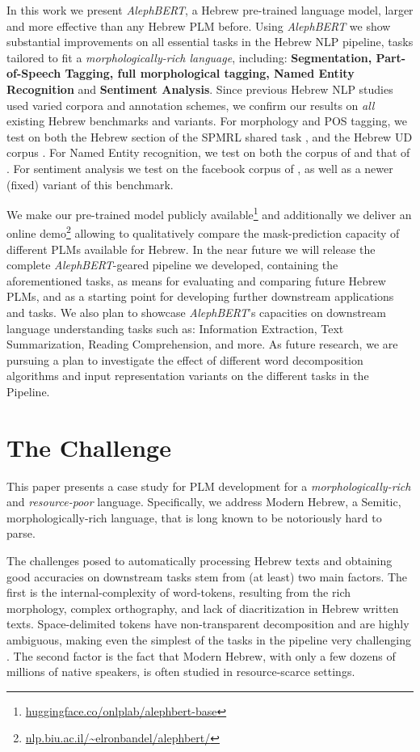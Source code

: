 \documentclass[11pt,a4paper]{article}
\begin{document}
In this work we present {\em AlephBERT}, a  Hebrew  pre-trained language model, larger and  more effective than any Hebrew PLM before. Using {\em AlephBERT} we show  substantial improvements on {all} essential tasks in the Hebrew NLP pipeline, tasks tailored to fit a {\em morphologically-rich language}, including:  {\bf Segmentation, Part-of-Speech Tagging, full morphological tagging, Named Entity Recognition} and {\bf  Sentiment Analysis}. Since previous Hebrew NLP studies used varied  corpora and annotation schemes, we confirm our results on {\em all} existing Hebrew benchmarks and variants. For morphology and POS tagging, we test on {both} the Hebrew section of the SPMRL shared task \cite{spmrl}, and the Hebrew  UD corpus \cite{hebUD}.  For Named Entity recognition, we test on  both the corpus of \citet{bmcner} and that of \citet{nemo}. For sentiment analysis we test on the facebook corpus of \citet{amram2018}, as well as a newer (fixed) variant of this benchmark.

We make 
our pre-trained 
model
publicly available\footnote{\url{huggingface.co/onlplab/alephbert-base}} and additionally we deliver an online demo\footnote{\url{nlp.biu.ac.il/~elronbandel/alephbert/}} allowing to qualitatively compare the mask-prediction capacity of different   PLMs  available for Hebrew. In the near future we will release the complete {\em AlephBERT}-geared pipeline we developed, containing the aforementioned tasks, as means for evaluating and comparing future Hebrew PLMs, and as a starting point for developing further downstream applications and tasks. 
We also plan to showcase {\em AlephBERT}'s capacities on downstream language understanding  tasks such as:  Information Extraction, Text Summarization, Reading Comprehension, and more.
As future research, we are pursuing a plan to investigate the effect of different word decomposition algorithms and input representation variants on the different tasks in the Pipeline.
\section{The Challenge}
This paper presents a case study for PLM development for a {\em morphologically-rich} and {\em resource-poor} language. Specifically, we address Modern Hebrew, a Semitic, morphologically-rich  language, that is long known to be notoriously hard to parse.

The challenges posed to automatically processing Hebrew texts and obtaining good accuracies on downstream tasks stem from (at least) two main factors. 
The first is the internal-complexity of word-tokens, resulting from the rich morphology, complex orthography, and lack of diacritization in Hebrew written texts. Space-delimited tokens have non-transparent decomposition and are highly ambiguous, making even the simplest of the tasks in the pipeline very challenging \cite{whatswrong}. 
The second factor is the fact that Modern Hebrew, with only a few dozens of millions of native speakers, is often studied in resource-scarce settings. 
\end{document}
